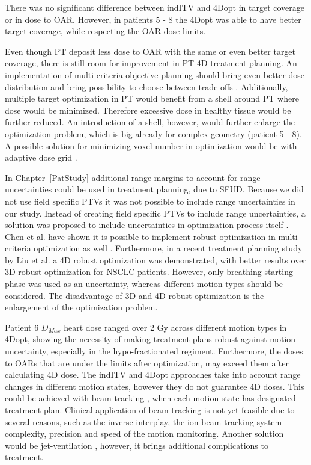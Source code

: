 \documentclass[type=dr, dr=rernat, accentcolor=tud7b,colorbacktitle, bigchapter, openright, twoside, 12pt ]{tudthesis}
\begin{document}
There was no significant difference between indITV and 4Dopt in target coverage or in dose to OAR. 
However, in patients 5 - 8 the 4Dopt was able to have better target coverage, while respecting the OAR dose limits.

Even though PT deposit less dose to OAR with the same or even better target coverage, there is still room for improvement in PT 4D treatment planning. 
An implementation of multi-criteria objective planning should bring even better dose distribution and bring possibility to choose between trade-offs \cite{Breedveld2007, Chen2010}. 
Additionally, multiple target optimization in PT would benefit from a shell around PT where dose would be minimized. Therefore excessive dose
in healthy tissue would be further reduced. An introduction of a shell, however, would further enlarge the optimization problem, which is big already for complex geometry (patient 5 - 8). 
A possible solution for minimizing voxel number in optimization would be with adaptive dose grid \cite{Prall2016a}.

In Chapter~\ref{PatStudy} additional range margins to account for range uncertainties could be used in treatment planning, due to SFUD. 
Because we did not use field specific PTVs it was not possible to include range uncertainties in our study.
Instead of creating field specific PTVs to include range uncertainties, a solution was proposed to include uncertainties in optimization process itself \cite{Pflugfelder2008, Unkelbach2009, Fredriksson2011, Chen2012}.
Chen et al. have shown it is possible to implement robust optimization in multi-criteria optimization as well \cite{Chen2012}. Furthermore, in a recent treatment planning study by Liu et al. \cite{Liu2016}
a 4D robust optimization was demonstrated, with better results over 3D robust optimization for NSCLC patients. However, only breathing starting phase was used as an uncertainty,
whereas different motion types should be considered. The disadvantage of 3D and 4D robust optimization is the enlargement of the optimization problem.

Patient 6 $D_{Max}$ heart dose ranged over 2 Gy across different motion types in 4Dopt, showing the necessity of making treatment plans robust against motion uncertainty, 
especially in the hypo-fractionated regiment. Furthermore, the doses to OARs that are under the limits after optimization, may exceed them after calculating 4D dose. 
The indITV and 4Dopt approaches take into account range changes in different motion states, however they do not guarantee 4D doses. This could be achieved with beam tracking \cite{Bert2007}, 
when each motion state has designated treatment plan. Clinical application of beam tracking is not yet feasible due to several reasons, such as the 
inverse interplay, the ion-beam tracking system complexity, precision and speed of the motion monitoring.
Another solution would be jet-ventilation \cite{Santiago2013}, however, it brings additional complications to treatment.
\end{document}
